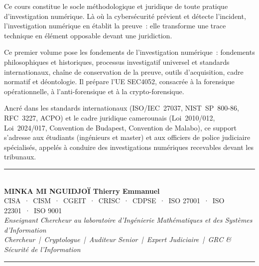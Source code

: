 \documentclass[12pt, twoside, openright, a4paper]{book}
\begin{document}
\begin{center}
\begin{minipage}{0.75\textwidth}
\color{white!85!gray}
Ce cours constitue le socle méthodologique et juridique de toute pratique
d'investigation numérique. Là où la cybersécurité prévient et détecte
l'incident, l'investigation numérique en établit la preuve~: elle
transforme une trace technique en élément opposable devant une
juridiction.

\medskip

Ce premier volume pose les fondements de l'investigation numérique~:
fondements philosophiques et historiques, processus investigatif universel
et standards internationaux, chaîne de conservation de la preuve, outils
d'acquisition, cadre normatif et déontologie. Il prépare l'UE SEC4052,
consacrée à la forensique opérationnelle, à l'anti-forensique et à la
crypto-forensique.

\medskip

Ancré dans les standards internationaux (ISO/IEC~27037, NIST~SP~800-86,
RFC~3227, ACPO) et le cadre juridique camerounais (Loi~2010/012,
Loi~2024/017, Convention de Budapest, Convention de Malabo), ce support
s'adresse aux étudiants (ingénieurs et master) et aux officiers de
police judiciaire  spécialisés, appelés à conduire des investigations numériques
recevables devant les tribunaux.
\end{minipage}
\end{center}

\vfill

\begin{center}
    {\color{CouleurAccent}\rule{0.7\linewidth}{1.2pt}}\\[1.2ex]
    {\color{white}\large\bfseries MINKA MI NGUIDJOÏ Thierry Emmanuel}\\[0.4ex]
    {\color{white!80!gray}\small
        CISA~·~CISM~·~CGEIT~·~CRISC~·~CDPSE~·~ISO 27001~·~ISO 22301~·~ISO 9001}\\[0.3ex]
    {\color{white!70!gray}\footnotesize\itshape
        Enseignant Chercheur au laboratoire d'Ingénierie Mathématiques et des Systèmes d'Information}\\[0.3ex]
    {\color{white!70!gray}\footnotesize\itshape
        Chercheur~|~Cryptologue~|~Auditeur Senior~|~Expert Judiciaire~|~GRC \& Sécurité de l'Information}\\[1.2ex]
    {\color{CouleurAccent}\rule{0.7\linewidth}{1.2pt}}
\end{center}

\afterpage{\nopagecolor}
\end{document}
